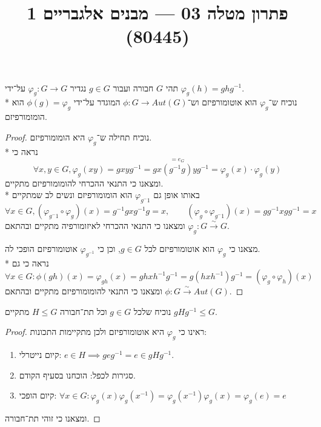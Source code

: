 
\title{פתרון מטלה 03 --- מבנים אלגבריים 1 (80445)}


\maketitle
\maketitleprint{}

\Question{}
\Subquestion{}
תהי $G$ חבורה ועבור $g \in G$ נגדיר $\varphi_g : G \to G$ על־ידי $\varphi_g(h) = g h g^{-1}$. \\*
נוכיח ש־$\varphi_g$ הוא אוטומורפיזם וש־$\phi : G \to Aut(G)$ המוגדר על־ידי $\phi(g) = \varphi_g$ הוא הומומורפיזם.
\begin{proof}
	נוכיח תחילה ש־$\varphi_g$ היא הומומורפיזם. \\*
	נראה כי
	\[
		\forall x, y \in G, \varphi_g(x y)
		= g x y g^{-1}
		= g x \overset{=e_G}{(g^{-1} g)} y g^{-1}
		= \varphi_g(x) \cdot \varphi_g(y)
	\]
	ומצאנו כי התנאי ההכרחי להומומורפיזם מתקיים. \\*
	באותו אופן גם $\varphi_{g^-1}$ הוא הומומורפיזם ונשים לב שמתקיים
	\[
		\forall x \in G, (\varphi_{g^-1} \circ \varphi_g)(x) = g^{-1}g x g^{-1} g = x, \qquad
		(\varphi_g \circ \varphi_{g^-1})(x) = g g^{-1} x g g^{-1} = x
	\]
	ומצאנו כי התנאי ההכרחי לאיזומורפיה מתקיים ובהתאם $\varphi_g : G \xrightarrow{\sim} G$.

	מצאנו כי $\varphi_g$ הוא אוטומורפיזם לכל $g \in G$, וכן כי $\varphi_{g^{-1}}$ אוטומורפיזם הופכי לה. \\*
	נראה כי גם
	\[
		\forall x \in G : \phi(g h)(x)
		= \varphi_{gh}(x)
		= gh x h^{-1} g^{-1}
		= g (h x h^{-1}) g^{-1}
		= (\varphi_g \circ \varphi_h)(x)
	\]
	ומצאנו כי התנאי להומומורפיזם מתקיים ובהתאם $\phi : G \xrightarrow{\sim} Aut(G)$.
\end{proof}

\Subquestion{}
נוכיח שלכל $g \in G$ וכל תת־חבורה $H \le G$ מתקיים $g H g^{-1} \le G$.
\begin{proof}
	ראינו כי $\varphi_g$ היא אוטומורפיזם ולכן מתקיימות התכונות:
	\begin{enumerate}
		\item קיום נייטרלי: $e \in H \implies g e g^{-1} = e \in gHg^{-1}$.
		\item סגירות לכפל: הוכחנו בסעיף הקודם.
		\item קיום הופכי: $\forall x \in G: \varphi_g(x) \varphi_g(x^{-1}) = \varphi_g(x^{-1}) \varphi_g(x) = \varphi_g(e) = e$
	\end{enumerate}
	ומצאנו כי זוהי תת־חבורה.
\end{proof}

